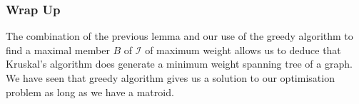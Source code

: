 \documentclass{beamer}
\begin{document}
\begin{frame}
\frametitle{Wrap Up}
The combination of the previous lemma and our use of the greedy algorithm to find a maximal member $B$ of $\mathcal{I}$ of maximum weight allows us to deduce that Kruskal's algorithm does generate a minimum weight spanning tree of a graph. \\We have seen that greedy algorithm gives us a solution to our optimisation problem as long as we have a matroid.
\end{frame}
\end{document}
